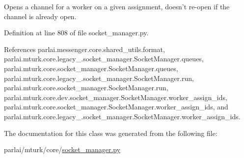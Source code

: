 \begin{DoxyVerb}Opens a channel for a worker on a given assignment, doesn't re-open
if the channel is already open.\end{DoxyVerb}
 

Definition at line 808 of file socket\+\_\+manager.\+py.



References parlai.\+messenger.\+core.\+shared\+\_\+utils.\+format, parlai.\+mturk.\+core.\+legacy\+\_.\+socket\+\_\+manager.\+Socket\+Manager.\+queues, parlai.\+mturk.\+core.\+socket\+\_\+manager.\+Socket\+Manager.\+queues, parlai.\+mturk.\+core.\+legacy\+\_.\+socket\+\_\+manager.\+Socket\+Manager.\+run, parlai.\+mturk.\+core.\+socket\+\_\+manager.\+Socket\+Manager.\+run, parlai.\+mturk.\+core.\+dev.\+socket\+\_\+manager.\+Socket\+Manager.\+worker\+\_\+assign\+\_\+ids, parlai.\+mturk.\+core.\+socket\+\_\+manager.\+Socket\+Manager.\+worker\+\_\+assign\+\_\+ids, and parlai.\+mturk.\+core.\+legacy\+\_.\+socket\+\_\+manager.\+Socket\+Manager.\+worker\+\_\+assign\+\_\+ids.



The documentation for this class was generated from the following file\+:\begin{DoxyCompactItemize}
\item 
parlai/mturk/core/\hyperlink{socket__manager_8py}{socket\+\_\+manager.\+py}\end{DoxyCompactItemize}
